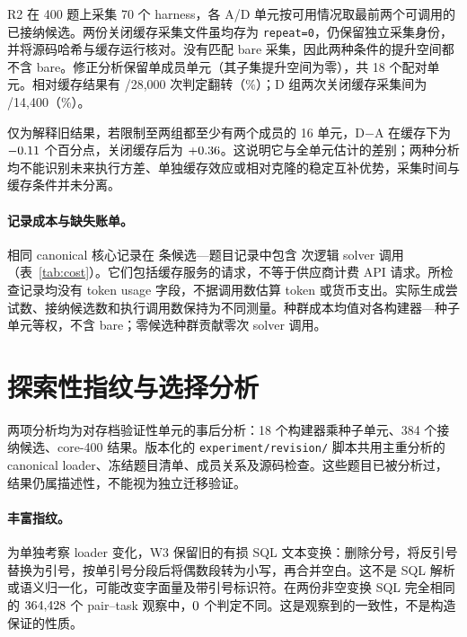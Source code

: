 R2 在 400 题上采集 70 个 harness，各 A/D 单元按可用情况取最前两个可调用的已接纳候选。两份关闭缓存采集文件虽均存为 \texttt{repeat=0}，仍保留独立采集身份，并将源码哈希与缓存运行核对。没有匹配 bare 采集，因此两种条件的提升空间都不含 bare。修正分析保留单成员单元（其子集提升空间为零），共 18 个配对单元。相对缓存结果有 \RevisionRtwoFlips/28,000 次判定翻转（\RevisionRtwoFlipPercent\%）；D 组两次关闭缓存采集间为 \RevisionRtwoRepeatFlips/14,400（\RevisionRtwoRepeatPercent\%）。

仅为解释旧结果，若限制至两组都至少有两个成员的 16 单元，D$-$A 在缓存下为 $-0.11$ 个百分点，关闭缓存后为 $+0.36$。这说明它与全单元估计的差别；两种分析均不能识别未来执行方差、单独缓存效应或相对克隆的稳定互补优势，采集时间与缓存条件并未分离。
\begin{table}[t]\centering\small

\caption{core-400、18 单元的修正敏感性结果，CI 未校正。K-matched 始终保留 bare；R2 排除 bare，并以已观察采集组为条件。}\label{tab:sensitivity}
\end{table}
\paragraph{记录成本与缺失账单。}相同 canonical 核心记录在 \RevisionCostRows{} 条候选—题目记录中包含 \RevisionLogicalCalls{} 次逻辑 solver 调用（表~\ref{tab:cost}）。它们包括缓存服务的请求，不等于供应商计费 API 请求。所检查记录均没有 token usage 字段，不据调用数估算 token 或货币支出。实际生成尝试数、接纳候选数和执行调用数保持为不同测量。种群成本均值对各构建器—种子单元等权，不含 bare；零候选种群贡献零次 solver 调用。
\begin{table}[t]\centering\small

\caption{core-400 canonical 描述性成本审核，每组 18 单元。逻辑调用不是计费请求或 token 数；末列为各单元候选种群每题调用数的均值。}\label{tab:cost}
\end{table}

\section{探索性指纹与选择分析}\label{app:rich}
两项分析均为对存档验证性单元的事后分析：18 个构建器乘种子单元、384 个接纳候选、core-400 结果。版本化的 \texttt{experiment/revision/} 脚本共用主重分析的 canonical loader、冻结题目清单、成员关系及源码检查。这些题目已被分析过，结果仍属描述性，不能视为独立迁移验证。
\paragraph{丰富指纹。}为单独考察 loader 变化，W3 保留旧的有损 SQL 文本变换：删除分号，将反引号替换为引号，按单引号分段后将偶数段转为小写，再合并空白。这不是 SQL 解析或语义归一化，可能改变字面量及带引号标识符。在两份非空变换 SQL 完全相同的 $364{,}428$ 个 pair--task 观察中，$0$ 个判定不同。这是观察到的一致性，不是构造保证的性质。

